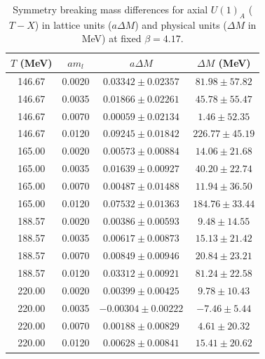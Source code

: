 \begin{table}[H]
\centering
\renewcommand{\arraystretch}{1.2}
\caption{Symmetry breaking mass differences for axial $U(1)_A$ ($T-X$) in lattice units ($a\Delta M$) and physical units ($\Delta M$ in MeV) at fixed $\beta=4.17$.}
\label{tab:u1_a_tx_asym_data}
\begin{tabular}{cccc}
\hline\hline
$T$ (MeV) & $am_l$ & $a\Delta M$ & $\Delta M$ (MeV) \\
\hline
146.67 & 0.0020 & $0.03342 \pm 0.02357$ & $81.98 \pm 57.82$ \\
146.67 & 0.0035 & $0.01866 \pm 0.02261$ & $45.78 \pm 55.47$ \\
146.67 & 0.0070 & $0.00059 \pm 0.02134$ & $1.46 \pm 52.35$ \\
146.67 & 0.0120 & $0.09245 \pm 0.01842$ & $226.77 \pm 45.19$ \\
\hline
165.00 & 0.0020 & $0.00573 \pm 0.00884$ & $14.06 \pm 21.68$ \\
165.00 & 0.0035 & $0.01639 \pm 0.00927$ & $40.20 \pm 22.74$ \\
165.00 & 0.0070 & $0.00487 \pm 0.01488$ & $11.94 \pm 36.50$ \\
165.00 & 0.0120 & $0.07532 \pm 0.01363$ & $184.76 \pm 33.44$ \\
\hline
188.57 & 0.0020 & $0.00386 \pm 0.00593$ & $9.48 \pm 14.55$ \\
188.57 & 0.0035 & $0.00617 \pm 0.00873$ & $15.13 \pm 21.42$ \\
188.57 & 0.0070 & $0.00849 \pm 0.00946$ & $20.84 \pm 23.21$ \\
188.57 & 0.0120 & $0.03312 \pm 0.00921$ & $81.24 \pm 22.58$ \\
\hline
220.00 & 0.0020 & $0.00399 \pm 0.00425$ & $9.78 \pm 10.43$ \\
220.00 & 0.0035 & $-0.00304 \pm 0.00222$ & $-7.46 \pm 5.44$ \\
220.00 & 0.0070 & $0.00188 \pm 0.00829$ & $4.61 \pm 20.32$ \\
220.00 & 0.0120 & $0.00628 \pm 0.00841$ & $15.41 \pm 20.62$ \\
\hline\hline
\end{tabular}
\end{table}

